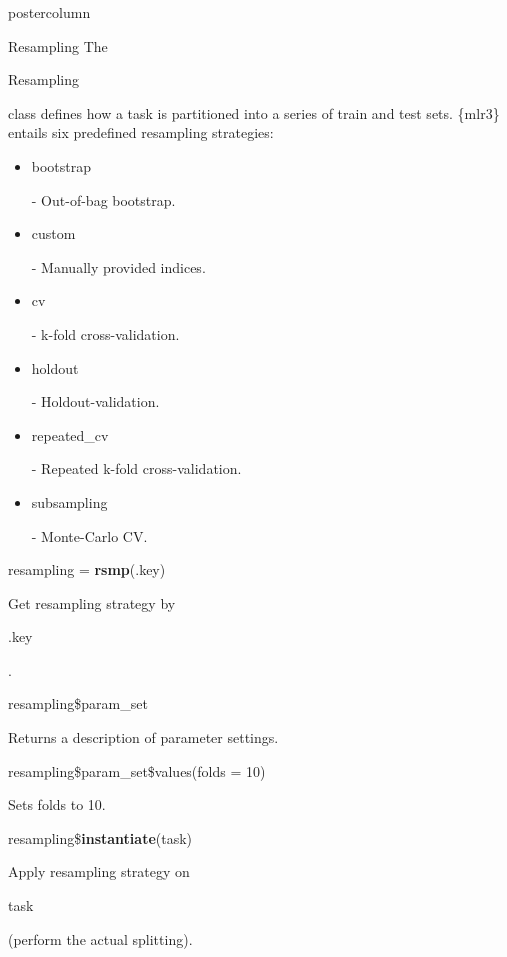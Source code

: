 \documentclass{beamer}
\newlength{\columnheight} %
\newcommand{\codeinline}[1]{\begin{codeboxinline}#1\end{codeboxinline}}
\begin{document}
\begin{withoutheader}
\begin{frame}[fragile]{}
	\begin{columns}
		\begin{column}{.245\textwidth}
			\begin{beamercolorbox}[center]{postercolumn}
				\begin{minipage}{.98\textwidth}
					\parbox[t][\columnheight]{\textwidth}{
							\begin{myblock}{Resampling}
							The \codeinline{Resampling} class defines how a task is
							partitioned into a series of train and test sets. \{mlr3\}
							entails six predefined resampling strategies:
							\\
							\begin{itemize}
								\item \codeinline{bootstrap} - Out-of-bag bootstrap.
								\item \codeinline{custom} - Manually provided indices.
								\item \codeinline{cv} - k-fold cross-validation.
								\item \codeinline{holdout} - Holdout-validation.
								\item \codeinline{repeated\_cv} - Repeated k-fold cross-validation.
								\item \codeinline{subsampling} - Monte-Carlo CV.
							\end{itemize}
							\vspace{1em}
							\begin{codebox}
								resampling = \textbf{rsmp}(.key)
							\end{codebox}
							Get resampling strategy by \codeinline{.key}.
							\\
							\begin{codebox}
								resampling\$param\_set
							\end{codebox}
							Returns a description of parameter settings.
							\\
							\begin{codebox}
								resampling\$param\_set\$values(folds = 10)
							\end{codebox}
							Sets folds to 10.
							\\
							\begin{codebox}
								resampling\$\textbf{instantiate}(task)
							\end{codebox}
							Apply resampling strategy on \codeinline{task} (perform
							the actual splitting).

\end{myblock}}
\end{minipage}
\end{beamercolorbox}
\end{column}
\end{columns}
\end{frame}
\end{withoutheader}
\end{document}
